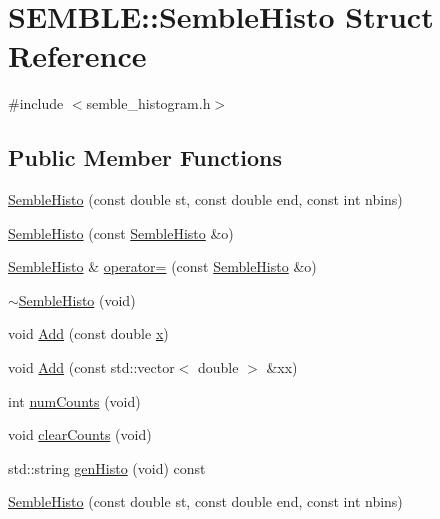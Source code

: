 \hypertarget{structSEMBLE_1_1SembleHisto}{}\section{S\+E\+M\+B\+LE\+:\+:Semble\+Histo Struct Reference}
\label{structSEMBLE_1_1SembleHisto}


{\ttfamily \#include $<$semble\+\_\+histogram.\+h$>$}

\subsection*{Public Member Functions}
\begin{DoxyCompactItemize}
\item 
\mbox{\hyperlink{structSEMBLE_1_1SembleHisto_adab30ab1f8ce4d13e7f6b58cfb29d10a}{Semble\+Histo}} (const double st, const double end, const int nbins)
\item 
\mbox{\hyperlink{structSEMBLE_1_1SembleHisto_a24d38ed2816616e275e8cb2cdc21edb6}{Semble\+Histo}} (const \mbox{\hyperlink{structSEMBLE_1_1SembleHisto}{Semble\+Histo}} \&o)
\item 
\mbox{\hyperlink{structSEMBLE_1_1SembleHisto}{Semble\+Histo}} \& \mbox{\hyperlink{structSEMBLE_1_1SembleHisto_ab56ac7f1fc65c1b263b398fdd0916440}{operator=}} (const \mbox{\hyperlink{structSEMBLE_1_1SembleHisto}{Semble\+Histo}} \&o)
\item 
\mbox{\hyperlink{structSEMBLE_1_1SembleHisto_ac93dd11573a8cd7ad35cd753e7e7bac6}{$\sim$\+Semble\+Histo}} (void)
\item 
void \mbox{\hyperlink{structSEMBLE_1_1SembleHisto_a00b90e6db2c96fc02580cdf857918a41}{Add}} (const double \mbox{\hyperlink{old__edb_8cc_a63584b830e7aaacb521b11b72291a4bc}{x}})
\item 
void \mbox{\hyperlink{structSEMBLE_1_1SembleHisto_a98b100d47d96f0f164165367b6b97d7a}{Add}} (const std\+::vector$<$ double $>$ \&xx)
\item 
int \mbox{\hyperlink{structSEMBLE_1_1SembleHisto_a5dce2f62e09886f2fece14047d1b3601}{num\+Counts}} (void)
\item 
void \mbox{\hyperlink{structSEMBLE_1_1SembleHisto_aeadf6a191dd07c0cd8ff12f01aed7839}{clear\+Counts}} (void)
\item 
std\+::string \mbox{\hyperlink{structSEMBLE_1_1SembleHisto_afb67e49249093e2269bff75fade6a6f8}{gen\+Histo}} (void) const
\item 
\mbox{\hyperlink{structSEMBLE_1_1SembleHisto_adab30ab1f8ce4d13e7f6b58cfb29d10a}{Semble\+Histo}} (const double st, const double end, const int nbins)

\end{DoxyCompactItemize}
